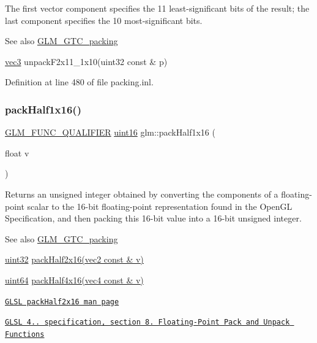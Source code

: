 The first vector component specifies the 11 least-\/significant bits of the result; the last component specifies the 10 most-\/significant bits.

\begin{DoxySeeAlso}{See also}
\hyperlink{group__gtc__packing}{G\+L\+M\+\_\+\+G\+T\+C\+\_\+packing} 

\hyperlink{group__core__types_ga1c47e8b3386109bc992b6c48e91b0be7}{vec3} unpack\+F2x11\+\_\+1x10(uint32 const \& p) 
\end{DoxySeeAlso}


Definition at line 480 of file packing.\+inl.

\mbox{\label{group__gtc__packing_gaba534b320836a35372e00af5771dd1a2}} 
\subsubsection{\texorpdfstring{pack\+Half1x16()}{packHalf1x16()}}
{\footnotesize\ttfamily \hyperlink{setup_8hpp_a33fdea6f91c5f834105f7415e2a64407}{G\+L\+M\+\_\+\+F\+U\+N\+C\+\_\+\+Q\+U\+A\+L\+I\+F\+I\+ER} \hyperlink{group__gtc__type__precision_gad8c2939e1fdd8e5828b31d95c52255d5}{uint16} glm\+::pack\+Half1x16 (\begin{DoxyParamCaption}\item[{float}]{v }\end{DoxyParamCaption})}

Returns an unsigned integer obtained by converting the components of a floating-\/point scalar to the 16-\/bit floating-\/point representation found in the Open\+GL Specification, and then packing this 16-\/bit value into a 16-\/bit unsigned integer.

\begin{DoxySeeAlso}{See also}
\hyperlink{group__gtc__packing}{G\+L\+M\+\_\+\+G\+T\+C\+\_\+packing} 

\hyperlink{group__gtc__type__precision_ga202b6a53c105fcb7e531f9b443518451}{uint32} \hyperlink{group__core__func__packing_ga082f6dd65f73a547ed3067ef00be036f}{pack\+Half2x16(vec2 const \& v)} 

\hyperlink{group__gtc__type__precision_gae3632bf9b37da66233d78930dd06378a}{uint64} \hyperlink{group__gtc__packing_ga8104f0b719b7792491f2b789a6dd6f96}{pack\+Half4x16(vec4 const \& v)} 

\href{http://www.opengl.org/sdk/docs/manglsl/xhtml/packHalf2x16.xml}{\tt G\+L\+SL pack\+Half2x16 man page} 

\href{http://www.opengl.org/registry/doc/GLSLangSpec.4.20.8.pdf}{\tt G\+L\+SL 4.. specification, section 8. Floating-\/\+Point Pack and Unpack Functions} 
\end{DoxySeeAlso}


